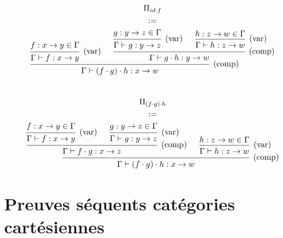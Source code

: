 \documentclass[conference]{IEEEtran}
\begin{document}
\begin{enumerate}
	\begin{align*}
		\begin{gathered}
			\Pi_{id \cdot f} \\
			:= \\
			\begin{prooftree}
				\hypo[]{f : x \rightarrow y \in \Gamma}
				\infer1[(var)]{\Gamma \vdash f : x \rightarrow y}
				\hypo[]{g : y \rightarrow z \in \Gamma}
				\infer1[(var)]{\Gamma \vdash g : y \rightarrow z}
				\hypo[]{h : z \rightarrow w \in \Gamma}
				\infer1[(var)]{\Gamma \vdash h : z \rightarrow w}
				\infer2[(comp)]{\Gamma \vdash g \cdot h : y \rightarrow w}
				\infer2[(comp)]{\Gamma \vdash (f \cdot g) \cdot h  : x \rightarrow w}
			\end{prooftree}
		\end{gathered}
	\end{align*} \\
	\begin{align*}
		\begin{gathered}
			\Pi_{(f \cdot g) \cdot h} \\
			:= \\
			\begin{prooftree}
				\hypo[]{f : x \rightarrow y \in \Gamma}
				\infer1[(var)]{\Gamma \vdash f : x \rightarrow y}
				\hypo[]{g : y \rightarrow z \in \Gamma}
				\infer1[(var)]{\Gamma \vdash g : y \rightarrow z}
				\infer2[(comp)]{\Gamma \vdash f \cdot g : x \rightarrow z}
				\hypo[]{h : z \rightarrow w \in \Gamma}
				\infer1[(var)]{\Gamma \vdash h : z \rightarrow w}
				\infer2[(comp)]{\Gamma \vdash (f \cdot g) \cdot h  : x \rightarrow w}
			\end{prooftree}
		\end{gathered}
	\end{align*}
\end{enumerate}

\section{Preuves séquents catégories cartésiennes}
\end{document}
